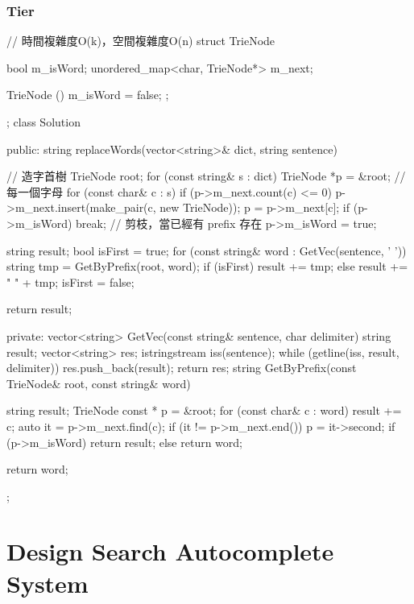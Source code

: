 \subsubsection{Tier}
\begin{Code}
// 時間複雜度O(k)，空間複雜度O(n)
struct TrieNode
{
    bool m_isWord;
    unordered_map<char, TrieNode*> m_next;

    TrieNode () { m_isWord = false; };
};
class Solution {
public:
    string replaceWords(vector<string>& dict, string sentence) {
        // 造字首樹
        TrieNode root;
        for (const string& s : dict)
        {
            TrieNode *p = &root;
            // 每一個字母
            for (const char& c : s)
            {
                if (p->m_next.count(c) <= 0) p->m_next.insert(make_pair(c, new TrieNode));
                p = p->m_next[c];
                if (p->m_isWord) break; // 剪枝，當已經有 prefix 存在
            }
            p->m_isWord = true;
        }

        string result;
        bool isFirst = true;
        for (const string& word : GetVec(sentence, ' '))
        {
            string tmp = GetByPrefix(root, word);
            if (isFirst)
                result += tmp;
            else
                result += " " + tmp;
            isFirst = false;
        }

        return result;
    }
private:
    vector<string> GetVec(const string& sentence, char delimiter)
    {
        string result;
        vector<string> res;
        istringstream iss(sentence);
        while (getline(iss, result, delimiter)) {
            res.push_back(result);
        }
        return res;
    }
    string GetByPrefix(const TrieNode& root, const string& word)
    {
        string result;
        TrieNode const * p = &root;
        for (const char& c : word)
        {
            result += c;
            auto it = p->m_next.find(c);
            if (it != p->m_next.end())
            {
                p = it->second;
                if (p->m_isWord) return result;
            }
            else
                return word;
        }

        return word;
    }
};
\end{Code}

\section{Design Search Autocomplete System} %
\label{sec:design-search-autocomplete-system}


